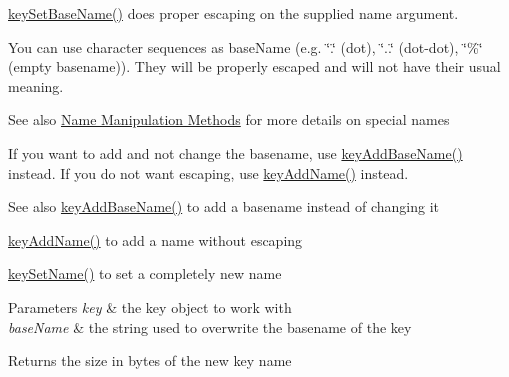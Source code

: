  \hyperlink{group__keyname_ga6e804bd453f98c28b0ff51430d1df407}{key\+Set\+Base\+Name()} does proper escaping on the supplied name argument.

You can use character sequences as {\ttfamily base\+Name} (e.\+g. {\ttfamily \char`\"{}.\char`\"{}} (dot), {\ttfamily \char`\"{}..\char`\"{}} (dot-\/dot), {\ttfamily \char`\"{}\%\char`\"{}} (empty basename)). They will be properly escaped and will not have their usual meaning.

\begin{DoxySeeAlso}{See also}
\hyperlink{group__keyname}{Name Manipulation Methods} for more details on special names
\end{DoxySeeAlso}
If you want to add and not change the basename, use \hyperlink{group__keyname_gaa942091fc4bd5c2699e49ddc50829524}{key\+Add\+Base\+Name()} instead. If you do not want escaping, use \hyperlink{group__keyname_gaa70593a2c772c4b7bc33423b9b10a270}{key\+Add\+Name()} instead.

\begin{DoxySeeAlso}{See also}
\hyperlink{group__keyname_gaa942091fc4bd5c2699e49ddc50829524}{key\+Add\+Base\+Name()} to add a basename instead of changing it 

\hyperlink{group__keyname_gaa70593a2c772c4b7bc33423b9b10a270}{key\+Add\+Name()} to add a name without escaping 

\hyperlink{group__keyname_ga7699091610e7f3f43d2949514a4b35d9}{key\+Set\+Name()} to set a completely new name
\end{DoxySeeAlso}

\begin{DoxyParams}{Parameters}
{\em key} & the key object to work with \\
\hline
{\em base\+Name} & the string used to overwrite the basename of the key \\
\hline
\end{DoxyParams}
\begin{DoxyReturn}{Returns}
the size in bytes of the new key name 
\end{DoxyReturn}

